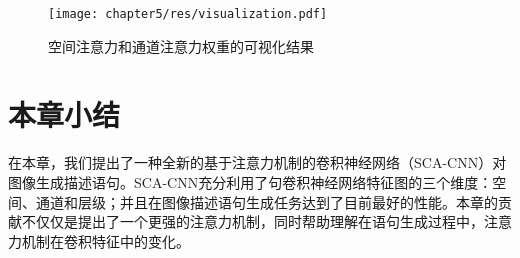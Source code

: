 \begin{figure}[htbp]
    \centering
    \texttt{[image: chapter5/res/visualization.pdf]}
    \caption{空间注意力和通道注意力权重的可视化结果}
    \label{ch5:fig:visualization}
\end{figure}


\section{本章小结}

在本章，我们提出了一种全新的基于注意力机制的卷积神经网络（SCA-CNN）对图像生成描述语句。SCA-CNN充分利用了句卷积神经网络特征图的三个维度：空间、通道和层级；并且在图像描述语句生成任务达到了目前最好的性能。本章的贡献不仅仅是提出了一个更强的注意力机制，同时帮助理解在语句生成过程中，注意力机制在卷积特征中的变化。